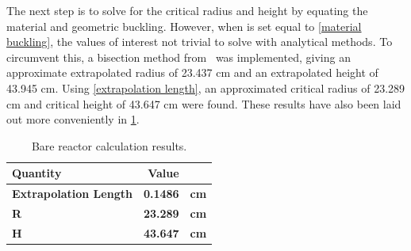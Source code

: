 \documentclass{anstrans}
\begin{document}
    The next step is to solve for the critical radius and height by equating the material and geometric buckling.
    However, when  is set equal to \cref{material buckling}, the values of interest not trivial to solve with analytical methods.
    To circumvent this, a bisection method from~\cite{gezerlisNumericalMethodsPhysicsa} was implemented, giving an approximate extrapolated radius of 23.437 cm and an extrapolated height of 43.945 cm.
    Using \cref{extrapolation length}, an approximated critical radius of 23.289 cm and critical height of 43.647 cm were found.
    These results have also been laid out more conveniently in \cref{tab: bare reactor}.
    \begin{table}
        \centering
        \begin{tabular}{lrl}
            \toprule
            \textbf{Quantity} & \textbf{Value} \\
            \midrule
            \textbf{Extrapolation Length} & \textbf{0.1486} & \textbf{cm} \\
            \textbf{R}                    & \textbf{23.289} & \textbf{cm} \\
            \textbf{H}                    & \textbf{43.647} & \textbf{cm} \\
            \bottomrule
        \end{tabular}
        \caption{Bare reactor calculation results.}
        \label{tab: bare reactor}
    \end{table}
\end{document}
